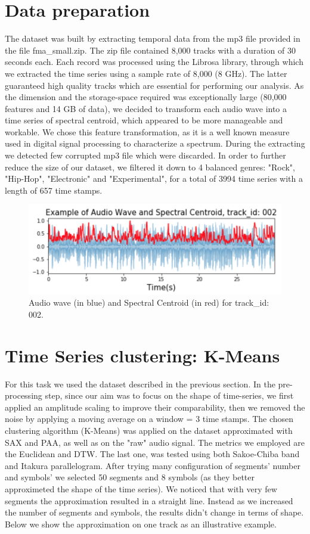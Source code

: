 \section{Data preparation}
The dataset was built by extracting temporal data from the mp3 file provided in the file fma\_small.zip. The zip file contained 8,000 tracks with a duration of 30 seconds each. Each record was processed using the Librosa library, through which we extracted the time series using a sample rate of 8,000 (8 GHz). The latter guaranteed high quality tracks which are essential for performing our analysis. As the dimension and the storage-space required was exceptionally large (80,000 features and 14 GB of data), we decided to transform each audio wave into a time series of spectral centroid, which appeared to be more manageable and workable. We chose this feature transformation, as it is a well known measure used in digital signal processing to characterize a spectrum. During the extracting we detected few corrupted mp3 file which were discarded. In order to further reduce the size of our dataset, we filtered it down to 4 balanced genres: "Rock", "Hip-Hop", "Electronic" and "Experimental", for a total of 3994 time series with a length of 657 time stamps.
\begin{figure}[!htb]
  \centering
  \includegraphics[width=0.5\linewidth]{images/spectralcentroid-audiowave-example.png}
  \caption{Audio wave (in blue) and Spectral Centroid (in red) for track\_id: 002.}
\end{figure}

\section{Time Series clustering: K-Means}

For this task we used the dataset described in the previous section. In the pre-processing step, since our aim was to focus on the shape of time-series, we first applied an amplitude scaling to improve their comparability, then we removed the noise by applying a moving average on a window = 3 time stamps. 
The chosen clustering algorithm (K-Means) was applied on the dataset approximated with SAX and PAA, as well as on the "raw" audio signal. The metrics we employed are the Euclidean and DTW. The last one, was tested using both Sakoe-Chiba band and Itakura parallelogram. 
After trying many configuration of segments' number and symbols' we selected 50 segments and 8 symbols (as they better approximeted the shape of the time series). We noticed that with very few segments the approximation resulted in a straight line. Instead as we increased the number of segments and symbols, the results didn't change in terms of shape. 
Below we show the approximation on one track as an illustrative example. 

